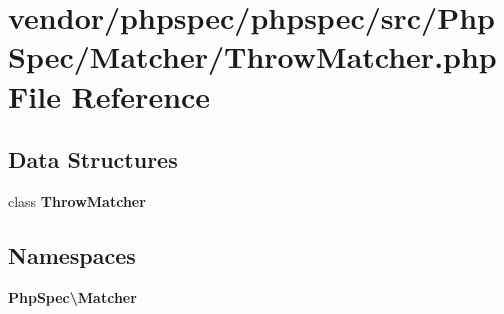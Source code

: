 \section{vendor/phpspec/phpspec/src/\+Php\+Spec/\+Matcher/\+Throw\+Matcher.php File Reference}
\label{_throw_matcher_8php}
\subsection*{Data Structures}
\begin{DoxyCompactItemize}
\item 
class {\bf Throw\+Matcher}
\end{DoxyCompactItemize}
\subsection*{Namespaces}
\begin{DoxyCompactItemize}
\item 
 {\bf Php\+Spec\textbackslash{}\+Matcher}
\end{DoxyCompactItemize}
